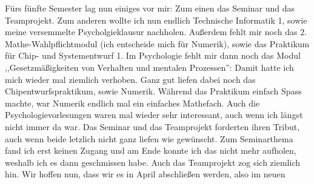 
Fürs fünfte Semester lag nun einiges vor mir: Zum einen das Seminar
und das Teamprojekt. Zum anderen wollte ich nun 
endlich Technische Informatik 1, sowie meine versemmelte Psycholgieklausur nachholen. Außerdem fehlt mir
noch das 2. Mathe-Wahlpflichtmodul (ich entscheide mich für Numerik), sowie  das Praktikum für Chip-
und Systementwurf 1. Im Psychologie fehlt mir dann noch das Modul ,,Gesetzmäßigkeiten von Verhalten und mentalen Prozessen'':
Damit hatte ich mich wieder mal ziemlich verhoben. Ganz gut liefen
dabei noch das Chipentwurfspraktikum, sowie Numerik. Während das
Praktikum einfach Spass machte, war Numerik endlich mal ein einfaches
Mathefach. Auch die Psychologievorlesungen waren mal wieder sehr
interessant, auch wenn ich längst nicht immer da war.  Das Seminar und
das Teamprojekt forderten ihren Tribut, auch wenn beide letzlich nicht
ganz liefen wie gewünscht. Zum Seminarthema fand ich erst keinen
Zugang und am Ende konnte ich das nicht mehr aufholen, weshalb ich es
dann geschmissen habe. Auch das Teamprojekt zog sich ziemlich hin. Wir
hoffen nun, dass wir es in April abschließen werden, also im neuen
